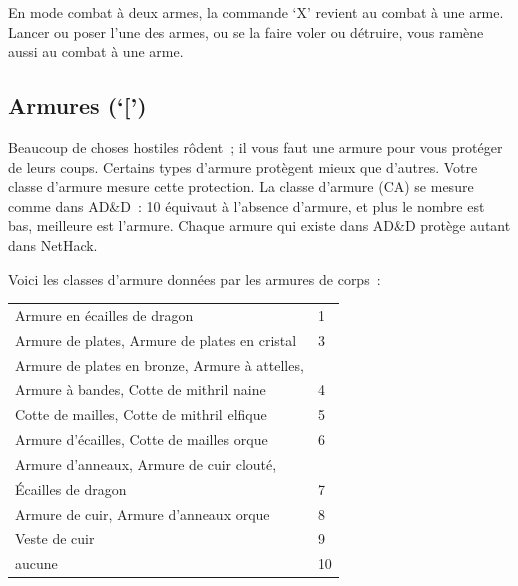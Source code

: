 \documentclass[titlepage]{article}
\begin{document}
En mode combat à deux armes, la commande `X' revient au combat à une
arme.
Lancer ou poser l'une des armes, ou se la faire voler ou détruire, vous
ramène aussi au combat à une arme.

\subsection{Armures (`[')}



Beaucoup de choses hostiles rôdent~; il vous faut une armure pour vous
protéger de leurs coups.
Certains types d'armure protègent mieux que d'autres.
Votre classe d'armure mesure cette protection.
La classe d'armure (CA) se mesure comme dans AD\&D~: 10 équivaut à
l'absence d'armure, et plus le nombre est bas, meilleure est l'armure.
Chaque armure qui existe dans AD\&D protège autant dans NetHack.


Voici les classes d'armure données par les armures de corps~:
\begin{center}
\begin{tabular}{ll}
Armure en écailles de dragon & 1\\
Armure de plates, Armure de plates en cristal & 3\\
Armure de plates en bronze, Armure à attelles, & \\
   Armure à bandes, Cotte de mithril naine & 4\\
Cotte de mailles, Cotte de mithril elfique & 5\\
Armure d'écailles, Cotte de mailles orque & 6\\
Armure d'anneaux, Armure de cuir clouté, & \\
   Écailles de dragon & 7\\
Armure de cuir, Armure d'anneaux orque & 8\\
Veste de cuir & 9\\
aucune & 10\\
\end{tabular}
\end{center}
\end{document}
